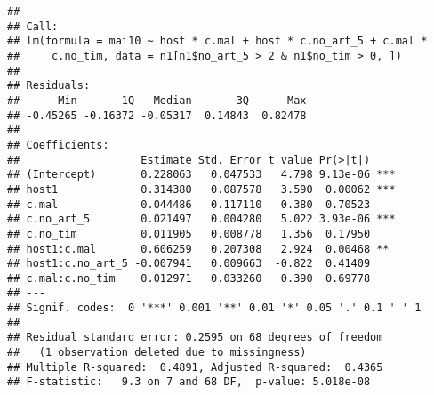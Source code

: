 \documentclass[]{article}
\newenvironment{Shaded}{\begin{snugshade}}{\end{snugshade}}
\newcommand{\KeywordTok}[1]{\textcolor[rgb]{0.13,0.29,0.53}{\textbf{#1}}}
\newcommand{\DataTypeTok}[1]{\textcolor[rgb]{0.13,0.29,0.53}{#1}}
\newcommand{\DecValTok}[1]{\textcolor[rgb]{0.00,0.00,0.81}{#1}}
\newcommand{\StringTok}[1]{\textcolor[rgb]{0.31,0.60,0.02}{#1}}
\newcommand{\OperatorTok}[1]{\textcolor[rgb]{0.81,0.36,0.00}{\textbf{#1}}}
\newcommand{\NormalTok}[1]{#1}
\begin{document}
\begin{verbatim}
## 
## Call:
## lm(formula = mai10 ~ host * c.mal + host * c.no_art_5 + c.mal * 
##     c.no_tim, data = n1[n1$no_art_5 > 2 & n1$no_tim > 0, ])
## 
## Residuals:
##      Min       1Q   Median       3Q      Max 
## -0.45265 -0.16372 -0.05317  0.14843  0.82478 
## 
## Coefficients:
##                   Estimate Std. Error t value Pr(>|t|)    
## (Intercept)       0.228063   0.047533   4.798 9.13e-06 ***
## host1             0.314380   0.087578   3.590  0.00062 ***
## c.mal             0.044486   0.117110   0.380  0.70523    
## c.no_art_5        0.021497   0.004280   5.022 3.93e-06 ***
## c.no_tim          0.011905   0.008778   1.356  0.17950    
## host1:c.mal       0.606259   0.207308   2.924  0.00468 ** 
## host1:c.no_art_5 -0.007941   0.009663  -0.822  0.41409    
## c.mal:c.no_tim    0.012971   0.033260   0.390  0.69778    
## ---
## Signif. codes:  0 '***' 0.001 '**' 0.01 '*' 0.05 '.' 0.1 ' ' 1
## 
## Residual standard error: 0.2595 on 68 degrees of freedom
##   (1 observation deleted due to missingness)
## Multiple R-squared:  0.4891, Adjusted R-squared:  0.4365 
## F-statistic:   9.3 on 7 and 68 DF,  p-value: 5.018e-08
\end{verbatim}

\begin{Shaded}
\end{Shaded}
\end{document}
